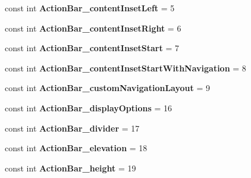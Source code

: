 \begin{DoxyCompactItemize}
const int {\bfseries Action\+Bar\+\_\+content\+Inset\+Left} = 5
\item 
\mbox{\label{classst_delivery_1_1_resource_1_1_styleable_ad7df31ccce08d4b5a55346c4d08d8303}} 
const int {\bfseries Action\+Bar\+\_\+content\+Inset\+Right} = 6
\item 
\mbox{\label{classst_delivery_1_1_resource_1_1_styleable_a2434bfe242dc91705cc45bab393421bd}} 
const int {\bfseries Action\+Bar\+\_\+content\+Inset\+Start} = 7
\item 
\mbox{\label{classst_delivery_1_1_resource_1_1_styleable_ac78d09871c8f34b76d5483fc0ff3723b}} 
const int {\bfseries Action\+Bar\+\_\+content\+Inset\+Start\+With\+Navigation} = 8
\item 
\mbox{\label{classst_delivery_1_1_resource_1_1_styleable_a2494285603b64b48ae7c1a0ef153457d}} 
const int {\bfseries Action\+Bar\+\_\+custom\+Navigation\+Layout} = 9
\item 
\mbox{\label{classst_delivery_1_1_resource_1_1_styleable_ac93146640282a24b433ce9ab80f30135}} 
const int {\bfseries Action\+Bar\+\_\+display\+Options} = 16
\item 
\mbox{\label{classst_delivery_1_1_resource_1_1_styleable_a27999d0b56243499a4d871a2ea70ff86}} 
const int {\bfseries Action\+Bar\+\_\+divider} = 17
\item 
\mbox{\label{classst_delivery_1_1_resource_1_1_styleable_ad0d515985d3bbc84313d3f4823d68dd9}} 
const int {\bfseries Action\+Bar\+\_\+elevation} = 18
\item 
\mbox{\label{classst_delivery_1_1_resource_1_1_styleable_ae8b2860ef127fb14ec0f45b0501b54b4}} 
const int {\bfseries Action\+Bar\+\_\+height} = 19
\item 
\mbox{\label{classst_delivery_1_1_resource_1_1_styleable_a75b78f6305ac4c6c60ff4d0395e48487}} 

\end{DoxyCompactItemize}
